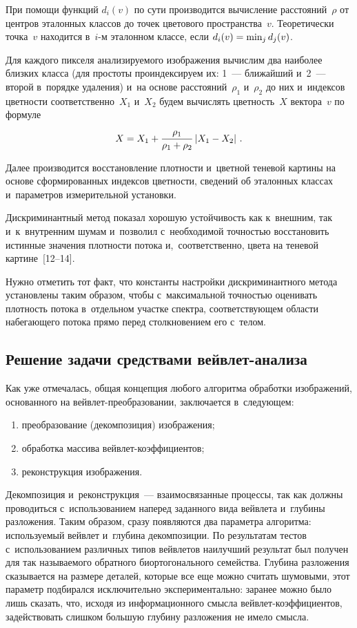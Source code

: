 \begin{multicols}{2}
При помощи функций $d_i(v)$ по сути производится вычисление расстояний~$\rho$ 
от центров эталонных классов
до точек цветового пространства~$v$. Теоретически точка~$v$ находится 
в~$i$-м эталонном классе, если $d_i(v)\hm=\min_{j}d_j(v)$.

Для каждого пикселя анализируемого изображения вычислим 
два наиболее близких класса (для простоты
проиндексируем их: 1~--- ближайший и~2~--- второй в~порядке удаления) и~на 
основе расстояний~$\rho_1$ и~$\rho_2$
до них и~индексов цветности соответственно~$X_1$ и~$X_2$ будем вычислять 
цветность~$X$ вектора~$v$ по формуле
\begin{equation*}
    X=X_1+\displaystyle\frac{\displaystyle \rho_1\mathstrut}{\displaystyle \rho_1+\rho_2\mathstrut}\left|X_1-X_2\right|\,.
\end{equation*}

Далее производится восстановление плотности  и~цветной теневой картины 
на основе сформированных индексов
цветности, сведений об эталонных классах и~параметров измерительной установки.

Дискриминантный метод показал хорошую устойчивость как к~внешним,
так и~к~внутренним шумам и~позволил с~необходимой точностью
восстановить истинные значения плотности потока и,~соответственно,
цвета на теневой картине~[12--14].

Нужно отметить тот факт, что константы настройки дискриминантного 
метода установлены таким образом, чтобы с~максимальной точностью оценивать 
плотность потока в~отдельном участке спектра, соответствующем области 
набегающего потока прямо перед столкновением его с~телом.



\subsection{Решение задачи средствами вейвлет-анализа}

Как уже отмечалась, общая концепция любого алгоритма обработки изображений, 
основанного на вейв\-лет-пре\-об\-ра\-зо\-ва\-нии, заключается в~сле\-ду\-ющем:
\begin{enumerate}[(1)]
    \item  преобразование (декомпозиция) изображения;
    \item  обработка массива вейв\-лет-ко\-эф\-фи\-ци\-ен\-тов;
    \item  реконструкция изображения.
\end{enumerate}
Декомпозиция и~реконструкция~--- взаимосвязанные процессы, так как
должны проводиться с~использованием наперед заданного вида вейвлета
и~глубины разложения. Таким образом, сразу появляются два параметра
алгоритма: используемый вейвлет и~глубина декомпозиции. По
результатам тестов с~использованием различных типов вейвлетов
наилучший результат был получен для так называемого обратного биортогонального
семейства. Глубина разложения сказывается на размере деталей,
которые все еще можно считать шумовыми, этот параметр подбирался
исключительно экспериментально: заранее можно было лишь сказать,
что, исходя из информационного смысла вейв\-лет-ко\-эф\-фи\-ци\-ен\-тов,
задействовать слишком большую глубину разложения не имело смысла.


\end{multicols}
